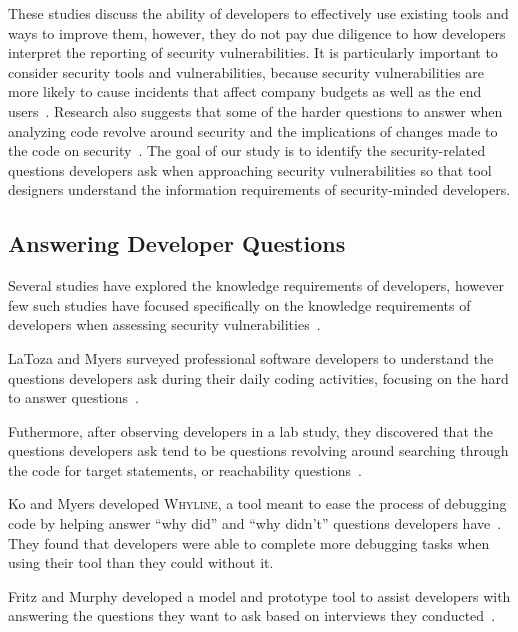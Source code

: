 \documentclass[conference]{IEEEtran}
\begin{document}
These studies discuss the ability of developers to effectively use existing tools and ways to improve them, however, they do not pay due diligence to how developers interpret the reporting of security vulnerabilities. 
It is particularly important to consider security tools and vulnerabilities, because security vulnerabilities are more likely to cause incidents that affect company budgets as well as the end users~\cite{chen2002mops}. 
Research also suggests that some of the harder questions to answer when analyzing code revolve around security and the implications of changes made to the code on security~\cite{latoza2010hard}.  
The goal of our study is to identify the security-related questions developers ask when approaching security vulnerabilities so that tool designers understand the information requirements of security-minded developers.

\subsection{Answering Developer Questions}
\label{questions}
Several studies have explored the knowledge requirements of developers, however few such studies have focused specifically on the knowledge requirements of developers when assessing security vulnerabilities~\cite{begel2014analyze, latoza2010hard, latoza2010developers}.

LaToza and Myers surveyed professional software developers to understand the questions developers ask during their daily coding activities, focusing on the hard to answer questions~\cite{latoza2010hard}. 

Futhermore, after observing developers in a lab study, they discovered that the questions developers ask tend to be questions revolving around searching through the code for target statements, or reachability questions~\cite{latoza2010developers}. 

Ko and Myers developed \textsc{Whyline}, a tool meant to ease the process of debugging code by helping answer ``why did'' and ``why didn't'' questions developers have~\cite{ko2004designing}. They found that developers were able to complete more debugging tasks when using their tool than they could without it.

Fritz and Murphy developed a model and prototype tool to assist developers with answering the questions they want to ask based on interviews they conducted~\cite{fritz2010using}.

\end{document}
